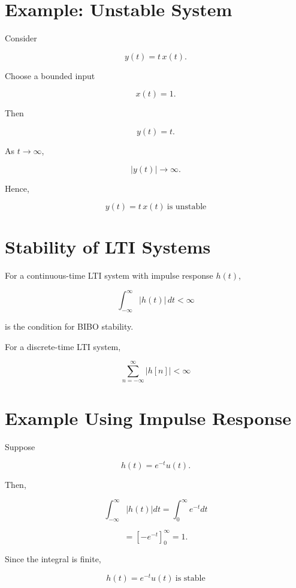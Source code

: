 \section{Example: Unstable System}

Consider

\[
y(t)=t\,x(t).
\]

Choose a bounded input

\[
x(t)=1.
\]

Then

\[
y(t)=t.
\]

As \(t\to\infty\),

\[
|y(t)|\to\infty.
\]

Hence,

\[
\boxed{
y(t)=t\,x(t)\ \text{is unstable}
}
\]


\section{Stability of LTI Systems}

For a continuous-time LTI system with impulse response \(h(t)\),

\[
\boxed{
\int_{-\infty}^{\infty}|h(t)|\,dt<\infty
}
\]

is the condition for BIBO stability.

For a discrete-time LTI system,

\[
\boxed{
\sum_{n=-\infty}^{\infty}|h[n]|<\infty
}
\]


\section{Example Using Impulse Response}

Suppose

\[
h(t)=e^{-t}u(t).
\]

Then,

\[
\int_{-\infty}^{\infty}|h(t)|dt
=
\int_0^\infty e^{-t}dt
\]

\[
=
\left[-e^{-t}\right]_0^\infty
=1.
\]

Since the integral is finite,

\[
\boxed{
h(t)=e^{-t}u(t)\ \text{is stable}
}
\]


